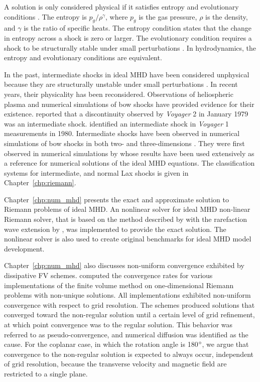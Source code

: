 A solution is only considered physical if it satisfies entropy and evolutionary conditions \citep{Jeffrey:1964}.  The entropy is $p_g/\rho^{\gamma}$, where $p_g$ is the gas pressure, $\rho$ is the density, and $\gamma$ is the ratio of specific heats.  The entropy condition states that the change in entropy across a shock is zero or larger.  The evolutionary condition requires a shock to be structurally stable under small perturbations \citep{Jeffrey:1964}.  In hydrodynamics, the entropy and evolutionary conditions are equivalent.

In the past, intermediate shocks in ideal MHD have been considered unphysical because they are structurally unstable under small perturbations \citep{Landau:1984}.  In recent years, their physicality has been reconsidered. Observations of heliospheric plasma and numerical simulations of bow shocks have provided evidence for their existence. \citet{Feng:2008} reported that a discontinuity observed by \emph{Voyager} 2 in January 1979 was an intermediate shock. \citet{Chao:1993} identified an intermediate shock in \emph{Voyager} 1 measurements in 1980. Intermediate shocks have been observed in numerical simulations of bow shocks in both two- and three-dimensions \citep{DeSterck:1998,DeSterck:2000}.  They were first observed in numerical simulations by \citet{Brio:1988} whose results have been used extensively as a reference for numerical solutions of the ideal MHD equations.  The classification systems for intermediate, and normal Lax shocks is given in Chapter~\ref{chp:riemann}.

Chapter~\ref{chp:num_mhd} presents the exact and approximate solution to Riemann problems of ideal MHD.  An nonlinear solver for ideal MHD non-linear Riemann solver, that is based on the method described by \citet{Dai:1994a} with the rarefaction wave extension by \citet{Ryu:1995a}, was implemented to provide the exact solution.  The nonlinear solver is also used to create original benchmarks for ideal MHD model development.  

Chapter~\ref{chp:num_mhd} also discusses non-uniform convergence exhibited by dissipative FV schemes.  \citet{Torrilhon:2003b} computed the convergence rates for various implementations of the finite volume method on one-dimensional Riemann problems with non-unique solutions. All implementations exhibited non-uniform convergence with respect to grid resolution.  The schemes produced solutions that converged toward the non-regular solution until a certain level of grid refinement, at which point convergence was to the regular solution.  This behavior was referred to as pseudo-convergence, and numerical diffusion was identified as the cause.  For the coplanar case, in which the rotation angle is 180$^\circ$, we argue that convergence to the non-regular solution is expected to always occur, independent of grid resolution, because the transverse velocity and magnetic field are restricted to a single plane.

